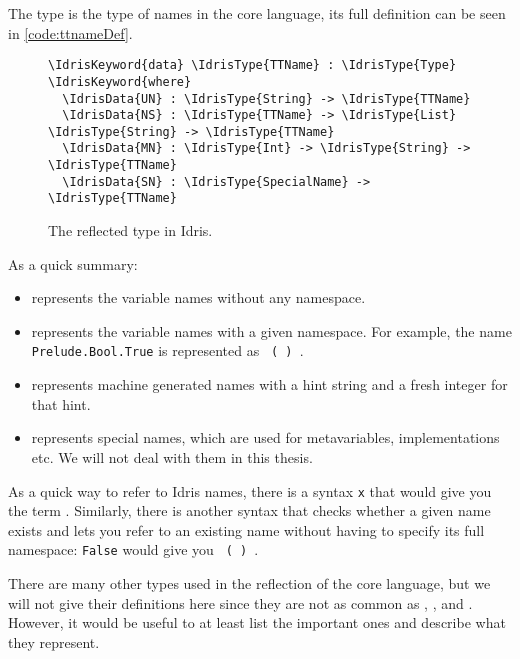 The  type is the type of names in the core language, its full definition can be seen in \autoref{code:ttnameDef}.

\begin{figure}[ht]
\caption{The reflected type \protect{} in Idris.}
\label{code:ttnameDef}
\begin{Verbatim}[framesep=2mm, label=\footnotesize{\normalfont{Idris}}, labelposition=topline]
\IdrisKeyword{data} \IdrisType{TTName} : \IdrisType{Type} \IdrisKeyword{where}
  \IdrisData{UN} : \IdrisType{String} -> \IdrisType{TTName}
  \IdrisData{NS} : \IdrisType{TTName} -> \IdrisType{List} \IdrisType{String} -> \IdrisType{TTName}
  \IdrisData{MN} : \IdrisType{Int} -> \IdrisType{String} -> \IdrisType{TTName}
  \IdrisData{SN} : \IdrisType{SpecialName} -> \IdrisType{TTName}
\end{Verbatim}
\end{figure}

As a quick summary:
\begin{itemize}
\item{} represents the variable names without any namespace.
\item{} represents the variable names with a given namespace. For example, the name \texttt{Prelude.Bool.True} is represented as
  \texttt{ ( ) }.
\item{} represents machine generated names with a hint string and a fresh integer for that hint.
\item{} represents special names, which are used for metavariables, implementations etc. We will not deal with them in this thesis.
\end{itemize}

As a quick way to refer to Idris names, there is a syntax
\texttt{\IdrisKeyword{\`{}\{\{}x\IdrisKeyword{\}\}}}
that would give you the term  .
Similarly, there is another syntax that checks whether a given name exists and
lets you refer to an existing name without having to specify its full
namespace: \texttt{\IdrisKeyword{\`{}\{}False\IdrisKeyword{\}}} would give you
\texttt{ ( ) }.

\medskip

There are many other types used in the reflection of the core language, but we
will not give their definitions here since they are not as common as \TT,
, and . However, it would be useful to at least list the
important ones and describe what they represent.


